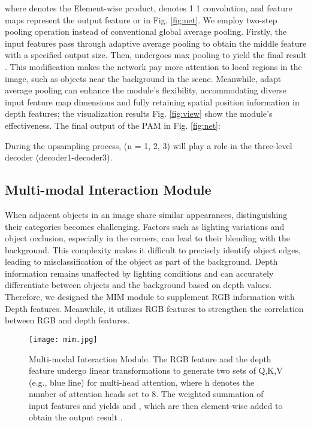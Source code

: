 \documentclass{aims}
\numberwithin{equation}{section}
\begin{document}
where  denotes the Element-wise product,  denotes 1  1 convolution, and feature maps  represent the output feature  or  in Fig. \ref{fig:net}. We employ two-step pooling operation instead of conventional global average pooling. Firstly, the input features  pass through adaptive average pooling to obtain the middle feature  with a specified output size. Then,  undergoes max pooling to yield the final result . This modification makes the network pay more attention to local regions in the image, such as objects near the background in the scene. Meanwhile, adapt average pooling can enhance the module's flexibility, accommodating diverse input feature map dimensions and fully retaining spatial position information in depth features; the visualization results Fig. \ref{fig:view} show the module's effectiveness. The final output  of the PAM in Fig. \ref{fig:net}:

During the upsampling process,  (n = 1, 2, 3) will play a role in the three-level decoder (decoder1-decoder3).

\subsection{Multi-modal Interaction Module}  

When adjacent objects in an image share similar appearances, distinguishing their categories becomes challenging. Factors such as lighting variations and object occlusion, especially in the corners, can lead to their blending with the background. This complexity makes it difficult to precisely identify object edges, leading to misclassification of the object as part of the background. Depth information remains unaffected by lighting conditions and can accurately differentiate between objects and the background based on depth values. Therefore, we designed the MIM module to supplement RGB information with Depth features. Meanwhile, it utilizes RGB features to strengthen the correlation between RGB and depth features.

\begin{figure}[t]
	\centering
		\centering
\centering
\texttt{[image: mim.jpg]}
\caption{Multi-modal Interaction Module. The RGB feature and the depth feature undergo linear transformations to generate two sets of Q,K,V (e.g., blue line) for multi-head attention, where h denotes the number of attention heads set to 8. The weighted summation of input features  and  yields  and , which are then element-wise added to obtain the output result . \label{fig:MIM}}
\end{figure}
\end{document}
